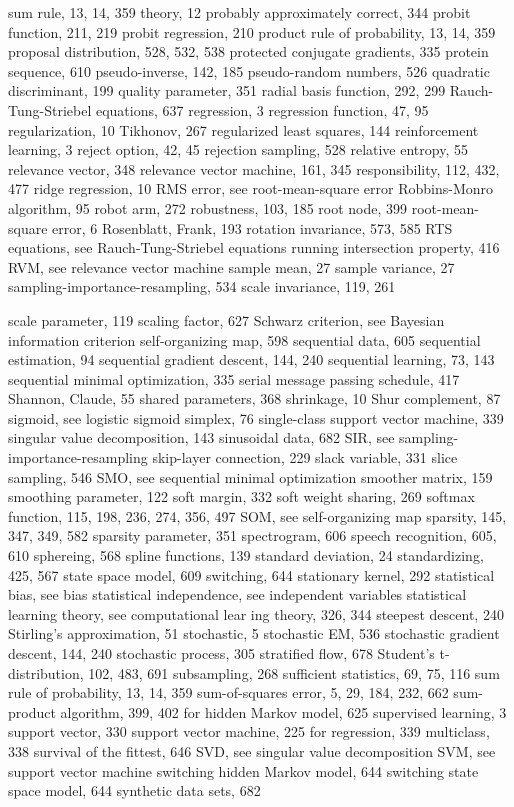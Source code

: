 \documentclass[
  10
]{article}
\begin{document}
sum rule, 13, 14, 359 theory, 12 probably approximately correct, 344
probit function, 211, 219 probit regression, 210 product rule of
probability, 13, 14, 359 proposal distribution, 528, 532, 538 protected
conjugate gradients, 335 protein sequence, 610 pseudo-inverse, 142, 185
pseudo-random numbers, 526 quadratic discriminant, 199 quality
parameter, 351 radial basis function, 292, 299 Rauch-Tung-Striebel
equations, 637 regression, 3 regression function, 47, 95 regularization,
10 Tikhonov, 267 regularized least squares, 144 reinforcement learning,
3 reject option, 42, 45 rejection sampling, 528 relative entropy, 55
relevance vector, 348 relevance vector machine, 161, 345 responsibility,
112, 432, 477 ridge regression, 10 RMS error, see root-mean-square error
Robbins-Monro algorithm, 95 robot arm, 272 robustness, 103, 185 root
node, 399 root-mean-square error, 6 Rosenblatt, Frank, 193 rotation
invariance, 573, 585 RTS equations, see Rauch-Tung-Striebel equations
running intersection property, 416 RVM, see relevance vector machine
sample mean, 27 sample variance, 27 sampling-importance-resampling, 534
scale invariance, 119, 261

scale parameter, 119 scaling factor, 627 Schwarz criterion, see Bayesian
information criterion self-organizing map, 598 sequential data, 605
sequential estimation, 94 sequential gradient descent, 144, 240
sequential learning, 73, 143 sequential minimal optimization, 335 serial
message passing schedule, 417 Shannon, Claude, 55 shared parameters, 368
shrinkage, 10 Shur complement, 87 sigmoid, see logistic sigmoid simplex,
76 single-class support vector machine, 339 singular value
decomposition, 143 sinusoidal data, 682 SIR, see
sampling-importance-resampling skip-layer connection, 229 slack
variable, 331 slice sampling, 546 SMO, see sequential minimal
optimization smoother matrix, 159 smoothing parameter, 122 soft margin,
332 soft weight sharing, 269 softmax function, 115, 198, 236, 274, 356,
497 SOM, see self-organizing map sparsity, 145, 347, 349, 582 sparsity
parameter, 351 spectrogram, 606 speech recognition, 605, 610 sphereing,
568 spline functions, 139 standard deviation, 24 standardizing, 425, 567
state space model, 609 switching, 644 stationary kernel, 292 statistical
bias, see bias statistical independence, see independent variables
statistical learning theory, see computational lear ing theory, 326, 344
steepest descent, 240 Stirling's approximation, 51 stochastic, 5
stochastic EM, 536 stochastic gradient descent, 144, 240 stochastic
process, 305 stratified flow, 678 Student's t-distribution, 102, 483,
691 subsampling, 268 sufficient statistics, 69, 75, 116 sum rule of
probability, 13, 14, 359 sum-of-squares error, 5, 29, 184, 232, 662
sum-product algorithm, 399, 402 for hidden Markov model, 625 supervised
learning, 3 support vector, 330 support vector machine, 225 for
regression, 339 multiclass, 338 survival of the fittest, 646 SVD, see
singular value decomposition SVM, see support vector machine switching
hidden Markov model, 644 switching state space model, 644 synthetic data
sets, 682
\end{document}
